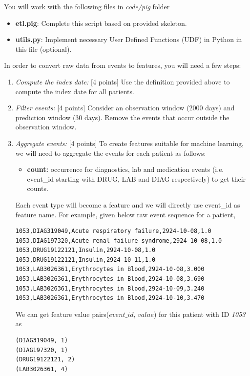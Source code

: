\documentclass[12pt]{article}
\begin{document}
You will work with the following files in \textit{code/pig} folder
\begin{itemize}
\item \textbf{etl.pig}: Complete this script based on provided skeleton. 
\item \textbf{utils.py}: Implement necessary User Defined Functions (UDF) in Python in this file (optional).
\end{itemize}

In order to convert raw data from events to features, you will need a few steps:
\begin{enumerate}
\item \emph{Compute the index date:} [4 points] Use the definition provided above to compute the index date for all patients. 

\item \emph{Filter events:} [4 points] Consider an observation window (2000 days) and prediction window (30 days).
Remove the events that occur outside the observation window. 

\item \emph{Aggregate events:} [4 points] To create features suitable for machine learning, we will need to aggregate the events for each patient as follows:
  \begin{itemize}
  \item \textbf{count:} occurrence for diagnostics, lab and medication events (i.e. event\_id starting with DRUG, LAB and DIAG respectively) to get their counts.  
  \end{itemize}
  
Each event type will become a feature and we will directly use event\_id as feature name. For example, given below raw event sequence for a patient, \\

\begin{lstlisting}[frame=single]
1053,DIAG319049,Acute respiratory failure,2924-10-08,1.0
1053,DIAG197320,Acute renal failure syndrome,2924-10-08,1.0
1053,DRUG19122121,Insulin,2924-10-08,1.0
1053,DRUG19122121,Insulin,2924-10-11,1.0
1053,LAB3026361,Erythrocytes in Blood,2924-10-08,3.000
1053,LAB3026361,Erythrocytes in Blood,2924-10-08,3.690
1053,LAB3026361,Erythrocytes in Blood,2924-10-09,3.240
1053,LAB3026361,Erythrocytes in Blood,2924-10-10,3.470
\end{lstlisting}

We can get feature value pairs($event\_id$, $value$) for this patient with ID \textit{1053} as \\
\begin{lstlisting}[frame=single]
(DIAG319049, 1)
(DIAG197320, 1)
(DRUG19122121, 2)
(LAB3026361, 4)
\end{lstlisting}



\end{enumerate}
\end{document}
